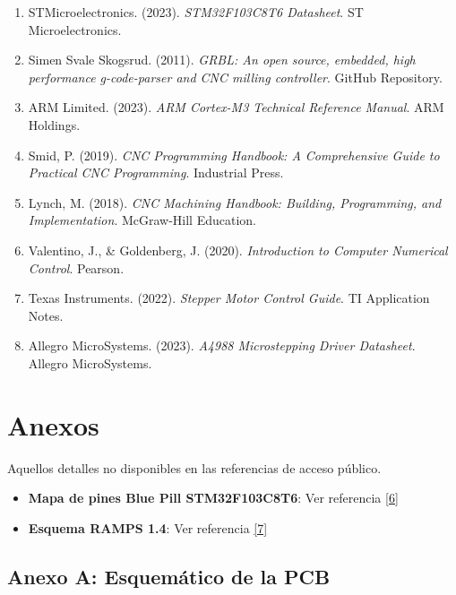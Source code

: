\documentclass[12pt]{article}
\begin{document}
\begin{enumerate}
    \item STMicroelectronics. (2023). \textit{STM32F103C8T6 Datasheet}. ST Microelectronics.
    
    \item Simen Svale Skogsrud. (2011). \textit{GRBL: An open source, embedded, high performance g-code-parser and CNC milling controller}. GitHub Repository.
    
    \item ARM Limited. (2023). \textit{ARM Cortex-M3 Technical Reference Manual}. ARM Holdings.
    
    \item Smid, P. (2019). \textit{CNC Programming Handbook: A Comprehensive Guide to Practical CNC Programming}. Industrial Press.
    
    \item Lynch, M. (2018). \textit{CNC Machining Handbook: Building, Programming, and Implementation}. McGraw-Hill Education.
    
    \item Valentino, J., \& Goldenberg, J. (2020). \textit{Introduction to Computer Numerical Control}. Pearson.
    
    \item Texas Instruments. (2022). \textit{Stepper Motor Control Guide}. TI Application Notes.
    
    \item Allegro MicroSystems. (2023). \textit{A4988 Microstepping Driver Datasheet}. Allegro MicroSystems.
\end{enumerate}

\section{Anexos}
Aquellos detalles no disponibles en las referencias de acceso público.

\begin{itemize}
  \item \textbf{Mapa de pines Blue Pill STM32F103C8T6}: Ver referencia \hyperref[ref6]{[6]}
  \item \textbf{Esquema RAMPS 1.4}: Ver referencia \hyperref[ref7]{[7]}
\end{itemize}


\subsection{Anexo A: Esquemático de la PCB}
\end{document}
